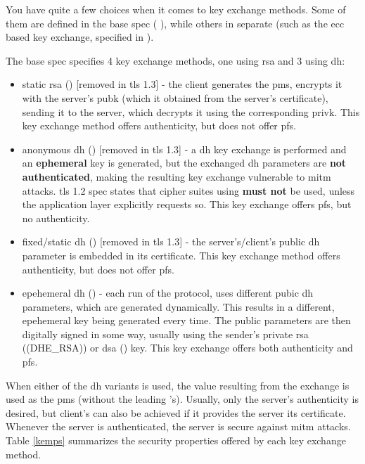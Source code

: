 \documentclass{llncs}
\begin{document}
You have quite a few choices when it comes to key exchange methods. Some of them
are defined in the base spec ( \cite{RFC5246}), while others
in separate  (such as the \gls{ecc} based key exchange, specified
in  \cite{RFC4492}).

The base spec specifies 4 key exchange methods, one using \gls{rsa} and 3 using
\gls{dh}:

\begin{itemize}
  \item static \gls{rsa} () [removed in \gls{tls} 1.3] - the client generates the \gls{pms}, encrypts it with the
  server's \gls{pubk} (which it obtained from the server's certificate),
  sending it to the server, which decrypts it using the corresponding \gls{privk}.
  This key exchange method offers authenticity, but does not offer \gls{pfs}.
  \item anonymous \gls{dh} () [removed in \gls{tls} 1.3] - a \gls{dh} key exchange is
  performed and an \textbf{ephemeral} key is generated, but the exchanged \gls{dh}
  parameters are \textbf{not authenticated}, making the resulting key exchange
  vulnerable to \gls{mitm} attacks. \gls{tls} 1.2 spec states that cipher suites
  using  \textbf{must not} be used, unless the application
  layer explicitly requests so. This key exchange offers \gls{pfs}, but no
  authenticity.
  \item fixed/static \gls{dh} () [removed in \gls{tls} 1.3] - the server's/client's public \gls{dh} parameter
  is embedded in its certificate. This key exchange method offers authenticity,
  but does not offer \gls{pfs}.
  \item epehemeral \gls{dh} () - each run of the protocol, uses
  different pubic \gls{dh} parameters, which are generated dynamically. This results
  in a different, epehemeral key being generated every time. The public parameters
  are then digitally signed in some way, usually using the sender's private
  \gls{rsa} (\codeword(DHE_RSA)) or \gls{dsa} () key. This key
  exchange offers both authenticity and \gls{pfs}.
\end{itemize}

When either of the \gls{dh} variants is used, the value resulting from the exchange is used
as the \gls{pms} (without the leading 's). Usually, only the server's
authenticity is desired, but client's can also be achieved if it provides the
server its certificate. Whenever the server is authenticated, the server is secure
against \gls{mitm} attacks. Table \ref{kemps} summarizes the security properties
offered by each key exchange method.
\end{document}
